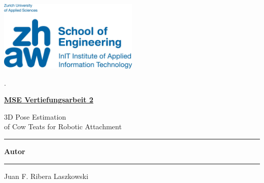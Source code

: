 
\newcommand{\uproman}[1]{\uppercase\expandafter{\romannumeral#1}}

\begin{titlepage}

\includegraphics[width=0.5\textwidth]{images/zhaw_logo.png}


\vskip 1.0cm
\begin{minipage}[b]{0.14\textwidth}
	\hskip 0.05cm
\end{minipage}
\begin{minipage}[b]{0.84\textwidth}
\begin{tiny}.\end{tiny}\vskip 2.8cm
	{\huge
	

	\textbf{\underline{MSE Vertiefungsarbeit 2}}\\
	
	\begin{minipage}[b]{0.9\textwidth}
		3D Pose Estimation \\ of Cow Teats for Robotic Attachment \\
	\end{minipage}
	\begin{minipage}[b]{0.1\textwidth}
	\end{minipage}
	\vskip 0.5cm}

	
	\begin{minipage}[b]{0.27\textwidth}
	\hrule\vskip 0.5cm
		\textbf{Autor}\\
	\end{minipage}
	\begin{minipage}[b]{0.03\textwidth}
	\hskip 0.5cm
	\end{minipage}
	\begin{minipage}[b]{0.7\textwidth}
	\hrule\vskip 0.5cm
		Juan F. Ribera Laszkowski \\
	\end{minipage}


\end{minipage}
\end{titlepage}
